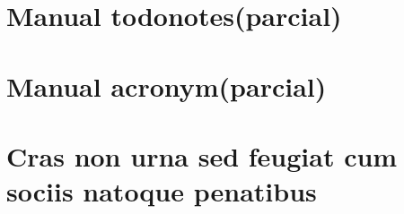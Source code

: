 
\begin{anexosenv}

\partanexos

\chapter{Manual todonotes(parcial)}
\label{manual-todonotes}





\chapter{Manual acronym(parcial)}



\chapter{Cras non urna sed feugiat cum sociis natoque penatibus}

\lipsum[1]



\end{anexosenv}
